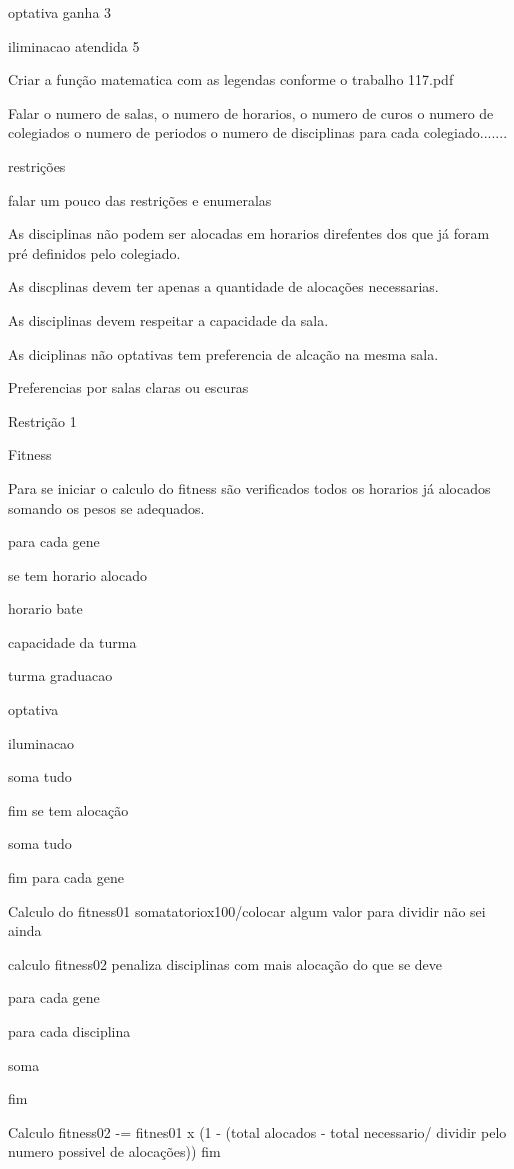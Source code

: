 \documentclass{abntpuc}
\begin{document}
optativa ganha 3

iliminacao atendida 5

Criar a função matematica com as legendas conforme o trabalho 117.pdf

Falar o numero de salas, o numero de horarios, o numero de curos o numero de colegiados o numero de periodos o numero de disciplinas para cada colegiado.......

restrições 


falar um pouco das restrições e enumeralas

As disciplinas não podem ser alocadas em horarios direfentes dos que já foram pré definidos pelo colegiado.

As discplinas devem ter apenas a quantidade de alocações necessarias.

As disciplinas devem respeitar a capacidade da sala.

As diciplinas não optativas tem preferencia de alcação na mesma sala.

Preferencias por salas claras ou escuras

Restrição 1 


Fitness

Para se iniciar o calculo do fitness são verificados todos os horarios já alocados somando os pesos se adequados.

para cada gene

se tem horario alocado 

horario bate

capacidade da turma

turma graduacao

optativa

iluminacao

soma tudo

fim se tem alocação

soma tudo

fim para cada gene

Calculo do fitness01 somatatoriox100/colocar algum valor  para dividir não sei ainda

calculo fitness02 penaliza disciplinas com mais alocação do que se deve

para cada gene 

para cada disciplina 

soma

fim

Calculo fitness02 -= fitnes01 x (1 - (total alocados - total necessario/ dividir pelo numero possivel de alocações))
fim
\end{document}
